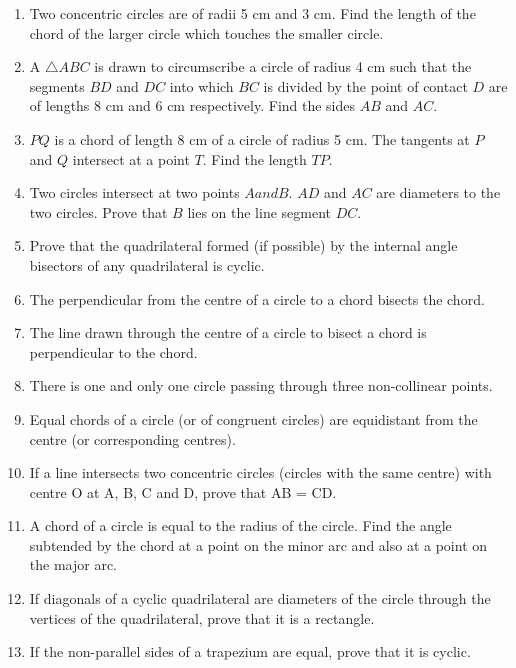 \begin{enumerate}[label=\thesubsection.\arabic*,ref=\thesubsection.\theenumi]
\begin{figure}[H]
\begin{center}
	\end{center}
	\caption{}
	\label{fig:ncert-circ-5}	
\end{figure}
%
\item  Two concentric circles are of radii 5 cm and 3 cm. Find the length of the chord of the larger circle which touches the smaller circle.
\item A $\triangle ABC$ is drawn to circumscribe a circle of radius 4 cm such that the segments $BD$ and $DC$ into which $BC$ is divided by the point of contact $D$ are of lengths 8 cm and 6 cm respectively. Find the sides $AB$ and $AC$.
\item $PQ$ is a chord of length 8 cm of a circle of radius 5 cm. The tangents at $P$ and $Q$ intersect at a point $T$. Find the length $TP$.
\item Two circles intersect at two points $A and B$. $AD$ and $AC$ are diameters to the two circles. Prove that $B$ lies on the line segment $DC$.
\item Prove that the quadrilateral formed (if possible) by the internal angle bisectors of any quadrilateral is cyclic.
\item  The perpendicular from the centre of a circle to a chord bisects the chord. 
\item  The line drawn through the centre of a circle to bisect a chord is perpendicular to the chord.
\item  There is one and only one circle passing through three non-collinear points. 
\item  Equal chords of a circle (or of congruent circles) are equidistant from the centre (or corresponding centres).
\item If a line intersects two concentric circles (circles with the same centre) with centre O at A, B, C and D, prove that AB = CD.

\item A chord of a circle is equal to the radius of the
circle. Find the angle subtended by the chord at
a point on the minor arc and also at a point on the
major arc.
\item If diagonals of a cyclic quadrilateral are diameters of the circle through the vertices of
the quadrilateral, prove that it is a rectangle.
\item If the non-parallel sides of a trapezium are equal, prove that it is cyclic.

\end{enumerate}
